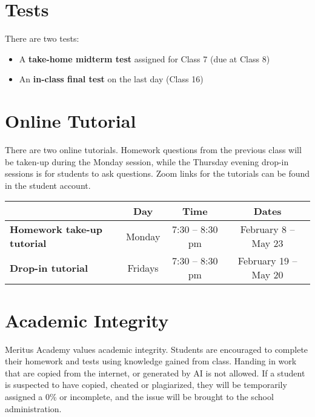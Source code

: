 \documentclass{../oss-handout}
\begin{document}
\section{Tests}
There are two tests:
\begin{itemize}[nosep]
\item A \textbf{take-home midterm test} assigned for Class 7 (due at Class 8)
\item An \textbf{in-class final test} on the last day (Class 16)
\end{itemize}



\section{Online Tutorial}
\label{tutorial}
There are two online tutorials. Homework questions from the previous class will
be taken-up during the Monday session, while the Thursday evening drop-in
sessions is for students to ask questions. Zoom links for the tutorials can be
found in the student account.
\begin{center}
  \bgroup
  \def\arraystretch{1.1}
  \begin{tabular}{|p{2.1in}|c|c|c|}
    \rowcolor{lightgray}
    \hline
    & \textbf{Day} & \textbf{Time} & \textbf{Dates} \\
    \hline\hline
    \textbf{Homework take-up tutorial} &
    \hspace{.2in}Monday\hspace{.2in} &
    \hspace{.2in}7:30 -- 8:30 pm\hspace{.2in} &
    \hspace{.2in}February 8 -- May 23\hspace{.2in} \\
    \hline
    \textbf{Drop-in tutorial} &
    Fridays &
    7:30 -- 8:30 pm & 
    February 19 -- May 20 \\
    \hline
  \end{tabular}
  \egroup
\end{center}



\section{Academic Integrity}
Meritus Academy values academic integrity. Students are encouraged to complete
their homework and tests using knowledge gained from class. Handing in work
that are copied from the internet, or generated by AI is not allowed. If a
student is suspected to have copied, cheated or plagiarized, they will be
temporarily assigned a 0\% or incomplete, and the issue will be brought to the
school administration.
\end{document}
